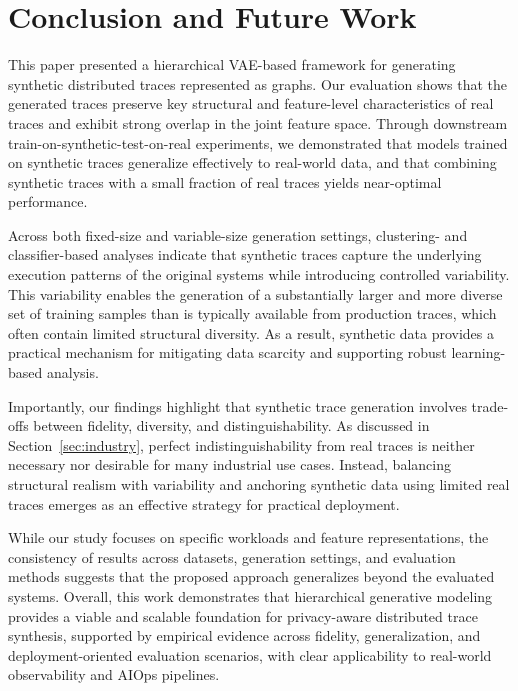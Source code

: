 \documentclass[sigconf,review]{acmart}
\begin{document}
\section{Conclusion and Future Work}
\label{sec:conclusion}

This paper presented a hierarchical VAE-based framework for generating synthetic distributed traces represented as graphs. Our evaluation shows that the generated traces preserve key structural and feature-level characteristics of real traces and exhibit strong overlap in the joint feature space. Through downstream train-on-synthetic-test-on-real experiments, we demonstrated that models trained on synthetic traces generalize effectively to real-world data, and that combining synthetic traces with a small fraction of real traces yields near-optimal performance.

Across both fixed-size and variable-size generation settings, clustering- and classifier-based analyses indicate that synthetic traces capture the underlying execution patterns of the original systems while introducing controlled variability. This variability enables the generation of a substantially larger and more diverse set of training samples than is typically available from production traces, which often contain limited structural diversity. As a result, synthetic data provides a practical mechanism for mitigating data scarcity and supporting robust learning-based analysis.

Importantly, our findings highlight that synthetic trace generation involves trade-offs between fidelity, diversity, and distinguishability. As discussed in Section~\ref{sec:industry}, perfect indistinguishability from real traces is neither necessary nor desirable for many industrial use cases. Instead, balancing structural realism with variability and anchoring synthetic data using limited real traces emerges as an effective strategy for practical deployment.

While our study focuses on specific workloads and feature representations, the consistency of results across datasets, generation settings, and evaluation methods suggests that the proposed approach generalizes beyond the evaluated systems. Overall, this work demonstrates that hierarchical generative modeling provides a viable and scalable foundation for privacy-aware distributed trace synthesis, supported by empirical evidence across fidelity, generalization, and deployment-oriented evaluation scenarios, with clear applicability to real-world observability and AIOps pipelines.
\end{document}
